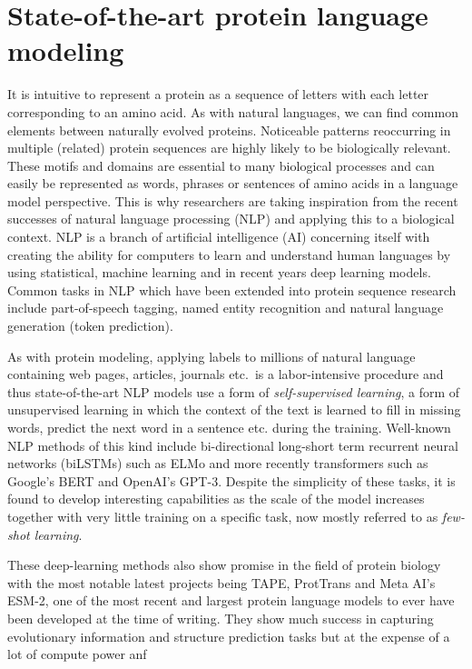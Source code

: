 \section{State-of-the-art protein language modeling}
It is intuitive to represent a protein as a sequence of letters with each letter corresponding to an amino acid. As with natural languages, we can find common elements between naturally evolved proteins. Noticeable patterns reoccurring in multiple (related) protein sequences are highly likely to be biologically relevant. These motifs and domains are essential to many biological processes and can easily be represented as words, phrases or sentences of amino acids in a language model perspective. This is why researchers are taking inspiration from the recent successes of natural language processing (NLP) and applying this to a biological context. NLP is a branch of artificial intelligence (AI) concerning itself with creating the ability for computers to learn and understand human languages by using statistical, machine learning and in recent years deep learning models. Common tasks in NLP which have been extended into protein sequence research include part-of-speech tagging, named entity recognition and natural language generation (token prediction).

As with protein modeling, applying labels to millions of natural language containing web pages, articles, journals etc.\ is a labor-intensive procedure and thus state-of-the-art NLP models use a form of \textit{self-supervised learning}, a form of unsupervised learning in which the context of the text is learned to fill in missing words, predict the next word in a sentence etc. during the training. Well-known NLP methods of this kind include bi-directional long-short term recurrent neural networks (biLSTMs) such as ELMo\cite{elmo} and more recently transformers such as Google's BERT\cite{bert} and OpenAI's GPT-3\cite{gpt3}. Despite the simplicity of these tasks, it is found to develop interesting capabilities as the scale of the model increases together with very little training on a specific task, now mostly referred to as \textit{few-shot learning}.

These deep-learning methods also show promise in the field of protein biology with the most notable latest projects being TAPE\cite{tape}, ProtTrans\cite{prottrans} and Meta AI's ESM-2\cite{esm2}, one of the most recent and largest protein language models to ever have been developed at the time of writing. They show much success in capturing evolutionary information and structure prediction tasks but at the expense of a lot of compute power anf